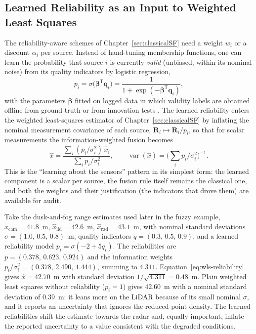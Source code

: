 \subsection{Learned Reliability as an Input to Weighted Least Squares}
\label{subsec:learned-reliability}
The reliability-aware schemes of Chapter~\ref{sec:classicalSF} need a weight $w_i$ or a discount $\alpha_i$ per source. Instead of hand-tuning membership functions, one can learn the probability that source $i$ is currently \emph{valid} (unbiased, within its nominal noise) from its quality indicators by logistic regression,
\begin{equation}
p_i=\sigma\!\big(\boldsymbol{\beta}^{\mathsf T}\mathbf{q}_i\big)=\frac{1}{1+\exp(-\boldsymbol{\beta}^{\mathsf T}\mathbf{q}_i)},
\label{eq:logistic-reliability}
\end{equation}
with the parameters $\boldsymbol{\beta}$ fitted on logged data in which validity labels are obtained offline from ground truth or from innovation tests \cite{bishop2006_prml}. The learned reliability enters the weighted least-squares estimator of Chapter~\ref{sec:classicalSF} by inflating the nominal measurement covariance of each source, $\mathbf{R}_i\mapsto\mathbf{R}_i/p_i$, so that for scalar measurements the information-weighted fusion becomes
\begin{equation}
\widehat{x}=\frac{\sum_i (p_i/\sigma_i^{2})\,\widehat{x}_i}{\sum_i p_i/\sigma_i^{2}},\qquad
\operatorname{var}(\widehat{x})=\Big(\sum_i p_i/\sigma_i^{2}\Big)^{-1}.
\label{eq:wls-reliability}
\end{equation}
This is the ``learning about the sensors'' pattern in its simplest form: the learned component is a scalar per source, the fusion rule itself remains the classical one, and both the weights and their justification (the indicators that drove them) are available for audit.

\begin{example}
\label{ex:logistic-wls}
Take the dusk-and-fog range estimates used later in the fuzzy example, $\widehat{x}_{\mathrm{cam}}=41.8$~m, $\widehat{x}_{\mathrm{lid}}=42.6$~m, $\widehat{x}_{\mathrm{rad}}=43.1$~m, with nominal standard deviations $\sigma=(1.0,\,0.5,\,0.8)$~m, quality indicators $q=(0.3,\,0.5,\,0.9)$, and a learned reliability model $p_i=\sigma(-2+5q_i)$. The reliabilities are $p=(0.378,\,0.623,\,0.924)$ and the information weights $p_i/\sigma_i^{2}=(0.378,\,2.490,\,1.444)$, summing to $4.311$. Equation~\eqref{eq:wls-reliability} gives $\widehat{x}=42.70$~m with standard deviation $1/\sqrt{4.311}=0.48$~m. Plain weighted least squares without reliability ($p_i=1$) gives $42.60$~m with a nominal standard deviation of $0.39$~m: it leans more on the LiDAR because of its small nominal $\sigma$, and it reports an uncertainty that ignores the reduced point density. The learned reliabilities shift the estimate towards the radar and, equally important, inflate the reported uncertainty to a value consistent with the degraded conditions.
\end{example}

